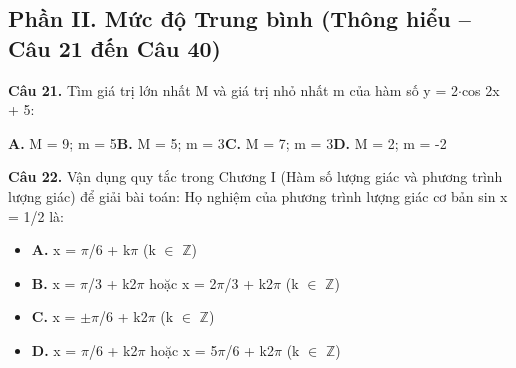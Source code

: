 \documentclass[11pt,a4paper]{article}
\begin{document}
\subsection*{\color{accent} Phần II. Mức độ Trung bình (Thông hiểu -- Câu 21 đến Câu 40)}
\textbf{\color{primary} Câu 21.} Tìm giá trị lớn nhất M và giá trị nhỏ nhất m của hàm số y = 2$\cdot$cos 2x + 5:\par
\hspace*{1.5em}\textbf{A.} M = 9; m = 5\quad\quad \textbf{B.} M = 5; m = 3\quad\quad \textbf{C.} M = 7; m = 3\quad\quad \textbf{D.} M = 2; m = -2\par\vspace{2pt}
\textbf{\color{primary} Câu 22.} Vận dụng quy tắc trong Chương I (Hàm số lượng giác và phương trình lượng giác) để giải bài toán: Họ nghiệm của phương trình lượng giác cơ bản sin x = 1/2 là:\par
\begin{itemize}\setlength{\itemsep}{1pt}\setlength{\parskip}{0pt}
  \item[] \textbf{A.} x = $\pi$/6 + k$\pi$ (k $\in$ $\mathbb{Z}$)
  \item[] \textbf{B.} x = $\pi$/3 + k2$\pi$ hoặc x = 2$\pi$/3 + k2$\pi$ (k $\in$ $\mathbb{Z}$)
  \item[] \textbf{C.} x = $\pm$$\pi$/6 + k2$\pi$ (k $\in$ $\mathbb{Z}$)
  \item[] \textbf{D.} x = $\pi$/6 + k2$\pi$ hoặc x = 5$\pi$/6 + k2$\pi$ (k $\in$ $\mathbb{Z}$)
\end{itemize}\vspace{2pt}
\end{document}
